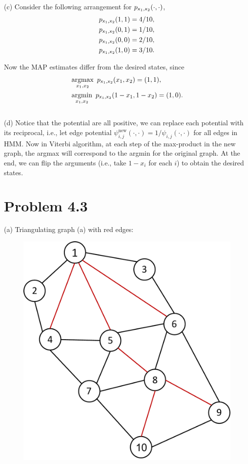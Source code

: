 \documentclass{article}
\newcommand{\s}[1]{\textsf{\textit{#1}}}
\newcommand{\qeds}{\hfill\qedsymbol}
\DeclareMathOperator*{\argmax}{argmax}
\DeclareMathOperator*{\argmin}{argmin}
\begin{document}
\noindent
(c)
%
Consider the following arrangement for $p_{\s{x}_1, \s{x}_2}(\cdot, \cdot)$,
\begin{align*}
	p_{\s{x}_1, \s{x}_2}(1, 1) &= 4/10,\\
	p_{\s{x}_1, \s{x}_2}(0, 1) &= 1/10,\\
	p_{\s{x}_1, \s{x}_2}(0, 0) &= 2/10,\\
	p_{\s{x}_1, \s{x}_2}(1, 0) &= 3/10.
\end{align*}

Now the MAP estimates differ from the desired states, since
\begin{align*}
	&\argmax_{x_1, x_2}\ p_{\s{x}_1, \s{x}_2}(x_1, x_2) = (1, 1),\\
	&\argmin_{x_1, x_2}\ p_{\s{x}_1, \s{x}_2}(1-x_1, 1-x_2) = (1, 0).
\end{align*}\qeds
\\

\noindent
(d)
%
Notice that the potential are all positive, we can replace each potential with its reciprocal, i.e., let edge potential $\psi^{\text{new}}_{i, j}(\cdot, \cdot) = 1/\psi_{i, j}(\cdot, \cdot)$ for all edges in HMM.
Now in Viterbi algorithm, at each step of the max-product in the new graph, the argmax will correspond
to the argmin for the original graph. At the end, we can flip the arguments (i.e., take $1-x_i$ for each $i$)
to obtain the desired states.

\pagebreak
\section*{Problem 4.3}
(a)
%
Triangulating graph (a) with red edges:
\begin{figure}[h]
  \centering
  \includegraphics[width=0.25\columnwidth]{3a1.pdf}
    \vspace{-0.1cm}
\end{figure}
\end{document}
